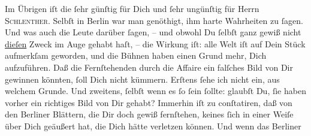 \pstart
           Im Übrigen iſt die \label{K_L02931-3v}\label{K_L02931-3} ſehr günſtig für Dich und ſehr ungünſtig für Herrn \textsc{Schlenther}. Selbſt in Berlin war man genöthigt, ihm
               harte Wahrheiten zu ſagen. Und was auch die Leute darüber ſagen, – und obwohl Du
               ſelbſt {\pb}ganz gewiß nicht \uline{dieſen} Zweck im Auge gehabt haſt, – die Wirkung iſt:  alle Welt iſt auf Dein Stück aufmerkſam geworden, und die Bühnen
               haben einen Grund mehr, Dich aufzuführen. Daß die Fernſtehenden durch die Affaire ein
               falſches Bild von  Dir gewinnen könnten, ſoll Dich
               nicht kümmern. Erſtens ſehe ich nicht ein, aus welchem Grunde. Und zweitens, ſelbſt
               wenn es ſo ſein ſollte: glaubſt Du, ſie haben vorher ein richtiges Bild von Dir
               gehabt? {\pb}Immerhin iſt zu conſtatiren, daß von den
                  Berliner Blättern, die Dir doch gewiß
               fernſtehen, keines ſich in einer Weiſe über Dich geäußert hat, die Dich hätte
               verletzen können. Und wenn das Berliner

